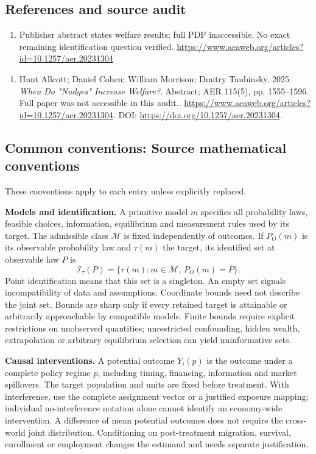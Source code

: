 \documentclass[11pt,a4paper]{article}
\begin{document}
\subsection*{References and source audit}
\begin{enumerate}
\item Publisher abstract states welfare results; full PDF inaccessible. No exact remaining identification question verified. \url{https://www.aeaweb.org/articles?id=10.1257/aer.20231304}
\end{enumerate}
\begin{enumerate}\raggedright
\item\hypertarget{definitions:source:30007591:1}{} Hunt Allcott; Daniel Cohen; William Morrison; Dmitry Taubinsky. 2025. \emph{When Do "Nudges" Increase Welfare?}. Abstract; AER 115(5), pp. 1555–1596. Full paper was not accessible in this audit..
\url{https://www.aeaweb.org/articles?id=10.1257/aer.20231304}.
DOI: \url{https://doi.org/10.1257/aer.20231304}.
\end{enumerate}

\subsection*{Common conventions: Source mathematical conventions}

These conventions apply to each entry unless explicitly replaced.

\textbf{Models and identification.} A primitive model \(m\) specifies all probability laws, feasible choices, information, equilibrium and measurement rules used by its target. The admissible class \(\mathcal M\) is fixed independently of outcomes. If \(P_O(m)\) is its observable probability law and \(\tau(m)\) the target, its identified set at observable law \(P\) is
\[
 \mathcal I_\tau(P)=\{\tau(m):m\in\mathcal M,\ P_O(m)=P\}.
\]
Point identification means that this set is a singleton. An empty set signals incompatibility of data and assumptions. Coordinate bounds need not describe the joint set. Bounds are sharp only if every retained target is attainable or arbitrarily approachable by compatible models. Finite bounds require explicit restrictions on unobserved quantities; unrestricted confounding, hidden wealth, extrapolation or arbitrary equilibrium selection can yield uninformative sets.

\textbf{Causal interventions.} A potential outcome \(Y_i(p)\) is the outcome under a complete policy regime \(p\), including timing, financing, information and market spillovers. The target population and units are fixed before treatment. With interference, use the complete assignment vector or a justified exposure mapping; individual no-interference notation alone cannot identify an economy-wide intervention. A difference of mean potential outcomes does not require the cross-world joint distribution. Conditioning on post-treatment migration, survival, enrollment or employment changes the estimand and needs separate justification.
\end{document}
